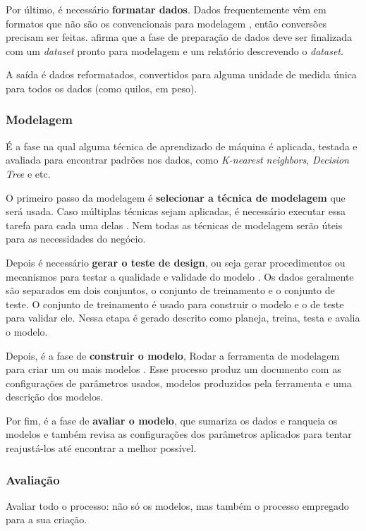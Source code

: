 Por último, é necessário \textbf{formatar dados}. Dados frequentemente vêm em formatos que não são os convencionais para modelagem \citep{dmfd}, então conversões precisam ser feitas.  afirma que a fase de preparação de dados deve ser finalizada com um \textit{dataset} pronto para modelagem e um relatório descrevendo o \textit{dataset}.

A saída é dados reformatados, convertidos para alguma unidade de medida única para todos os dados (como quilos, em peso).

\subsubsection{Modelagem}
É a fase na qual alguma técnica de aprendizado de máquina é aplicada, testada e avaliada para encontrar padrões nos dados, como \textit{K-nearest neighbors}, \textit{Decision Tree }e etc.

O primeiro passo da modelagem é \textbf{selecionar a técnica de modelagem} que será usada. Caso múltiplas técnicas sejam aplicadas, é necessário executar essa tarefa para cada uma delas \citep{crispmanual}. Nem todas as técnicas de modelagem serão úteis para as necessidades do negócio.

Depois é necessário \textbf{gerar o teste de design}, ou seja gerar procedimentos ou mecanismos para testar a qualidade e validade do modelo \citep{crispmanual}. Os dados geralmente são separados em dois conjuntos, o conjunto de treinamento e o conjunto de teste. O conjunto de treinamento é usado para construir o modelo e o de teste para validar ele. Nessa etapa é gerado descrito como planeja, treina, testa e avalia o modelo.

Depois, é a fase de \textbf{construir o modelo}, Rodar a ferramenta de modelagem para criar um ou mais modelos \citep{crispmanual}. Esse processo produz um documento com as configurações de parâmetros usados, modelos produzidos pela ferramenta e uma descrição dos modelos.

Por fim, é a fase de \textbf{avaliar o modelo}, que sumariza os dados e ranqueia os modelos e também revisa as configurações dos parâmetros aplicados para tentar reajustá-los até encontrar a melhor possível.

\subsubsection{Avaliação}
Avaliar todo o processo: não só os modelos, mas também o processo empregado para a sua criação.

